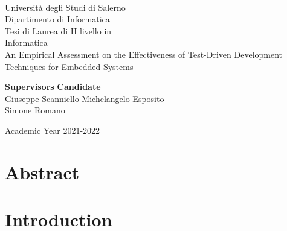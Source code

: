 \documentclass[11pt, oneside]{book}
\begin{document}
    \begin{titlepage}
        \begin{center}
            \\[0.2truecm]
            {\Large Universit\`a degli Studi di Salerno}\\[0.2truecm]
            {\large Dipartimento di Informatica}\\
            \hrulefill
            \vfill
            {\large Tesi di Laurea di II livello in }\\[0.2truecm]
            {\Large Informatica}\\
            \vfill\vfill
            {\Huge An Empirical Assessment on the Effectiveness of Test-Driven Development Techniques for Embedded Systems}
            \vfill\vfill
            
            
            {\bf Supervisors} \hfill {\bf Candidate}\ \ \\
            Giuseppe Scanniello \hfill Michelangelo Esposito\\
            Simone Romano \hfill \ \ \\
            
            \vfill
            \hrulefill 
            
            Academic Year 2021-2022
        \end{center}
    \end{titlepage}


    \chapter*{Abstract}
    
    
    \tableofcontents
    \pagestyle{plain}

    
    

    \chapter{Introduction}
    \setcounter{page}{1} 	%
    
    
    
    
    
    
    

    \nocite{*}
    \printbibliography[title={Bibliography}] 

    \appendix
    
    
    
    
    
\end{document}
